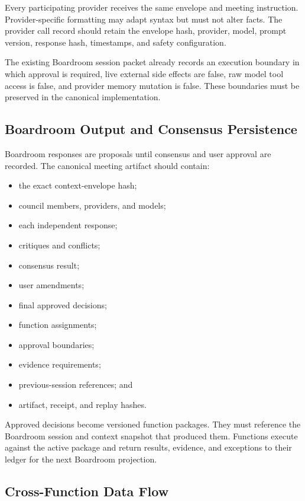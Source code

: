 Every participating provider receives the same envelope and meeting instruction.
Provider-specific formatting may adapt syntax but must not alter facts. The
provider call record should retain the envelope hash, provider, model, prompt
version, response hash, timestamps, and safety configuration.

The existing Boardroom session packet already records an execution boundary in
which approval is required, live external side effects are false, raw model tool
access is false, and provider memory mutation is false. These boundaries must be
preserved in the canonical implementation.

\subsection{Boardroom Output and Consensus Persistence}

Boardroom responses are proposals until consensus and user approval are recorded.
The canonical meeting artifact should contain:

\begin{itemize}
  \item the exact context-envelope hash;
  \item council members, providers, and models;
  \item each independent response;
  \item critiques and conflicts;
  \item consensus result;
  \item user amendments;
  \item final approved decisions;
  \item function assignments;
  \item approval boundaries;
  \item evidence requirements;
  \item previous-session references; and
  \item artifact, receipt, and replay hashes.
\end{itemize}

Approved decisions become versioned function packages. They must reference the
Boardroom session and context snapshot that produced them. Functions execute
against the active package and return results, evidence, and exceptions to their
ledger for the next Boardroom projection.

\subsection{Cross-Function Data Flow}

